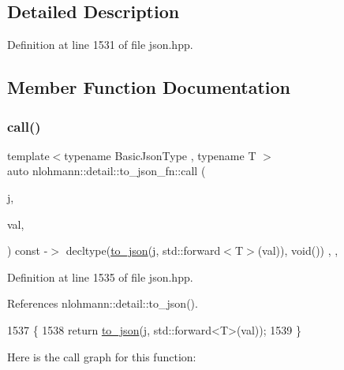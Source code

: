 \subsection{Detailed Description}


Definition at line 1531 of file json.\+hpp.



\subsection{Member Function Documentation}
\mbox{\label{structnlohmann_1_1detail_1_1to__json__fn_ada2ce804ebf3b55f6e3e46ff3a055394}} 
\subsubsection{\texorpdfstring{call()}{call()}\hspace{0.1cm}{\footnotesize\ttfamily [1/2]}}
{\footnotesize\ttfamily template$<$typename Basic\+Json\+Type , typename T $>$ \\
auto nlohmann\+::detail\+::to\+\_\+json\+\_\+fn\+::call (\begin{DoxyParamCaption}\item[{Basic\+Json\+Type \&}]{j,  }\item[{T \&\&}]{val,  }\item[{\hyperlink{structnlohmann_1_1detail_1_1priority__tag}{priority\+\_\+tag}$<$ 1 $>$}]{ }\end{DoxyParamCaption}) const -\/$>$ decltype(\hyperlink{namespacenlohmann_1_1detail_a1a804b98cbe89b7e44b698f2ca860490}{to\+\_\+json}(j, std\+::forward$<$T$>$(val)), void())
    \hspace{0.3cm}{\ttfamily [inline]}, {\ttfamily [private]}, {\ttfamily [noexcept]}}



Definition at line 1535 of file json.\+hpp.



References nlohmann\+::detail\+::to\+\_\+json().


\begin{DoxyCode}
1537     \{
1538         \textcolor{keywordflow}{return} \hyperlink{namespacenlohmann_1_1detail_a1a804b98cbe89b7e44b698f2ca860490}{to\_json}(j, std::forward<T>(val));
1539     \}
\end{DoxyCode}
Here is the call graph for this function\+:
\mbox{\label{structnlohmann_1_1detail_1_1to__json__fn_adbd2247cecd3cdd072f9a28ef84e85f4}} 
